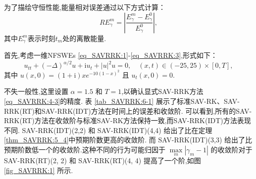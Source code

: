 为了描绘守恒性能,能量相对误差通过以下方式计算：
\begin{equation}\label{eq_SAVRRK:105}
	R E_{\gamma}^{m} = \left|\frac{E_{\gamma}^{m} - E_{\gamma}^{0}}{E_{\gamma}^{0}}\right|,
\end{equation}
其中$E_{\gamma}^{m}$表示时刻$t_m$处的离散能量.

\begin{example}\label{exp_SAVRRK:1}
	\cite{ranLinearlyImplicitConservative2016} 
	首先,考虑一维NFSWEs \eqref{eq_SAVRRK:1}-\eqref{eq_SAVRRK:3},形式如下：
	\begin{equation}\label{eq_SAVRRK:108}
		u_{t t}+(-\Delta)^{\alpha / 2} u+\mathrm{i}u_t+|u|^2 u=0, \quad (x,t)\in  (-25, 25)\times[0, T],
	\end{equation}
	其中 $u(x, 0)=(1+\mathrm{i}) x e^{-10(1-x)^2}$ 且 $u_t(x, 0)=0$.
	\end{example}
		
	
		
	不失一般性,这里设置 $\alpha=1.5$ 和 $T=1$,以确认显式SAV-RRK方法\eqref{eq_SAVRRK:4-3}的精度.
	表 \ref{tab_SAVRRK:6-1} 展示了标准SAV-RK、SAV-RRK(RT)和SAV-RRK(IDT)方法在时间上的误差和收敛阶.
	可以看到,所有的SAV-RRK(RT)方法在收敛阶与标准SAV-RK方法保持一致,而SAV-RRK(IDT)方法表现不同.
	SAV-RRK(IDT)(2,2) 和 SAV-RRK(IDT)(4,4) 给出了比在定理\ref{thm_SAVRRK:5_4}中预期阶数更高的收敛阶.
	而 SAV-RRK(IDT)(3,3) 给出了比预期阶数低一个的收敛阶.这种不同的行为可能归因于 $\max\limits _m\left|\gamma_m-1\right|$ 
	的收敛阶对于 SAV-RRK(RT)(2, 2) 和 SAV-RRK(RT)(4, 4) 提高了一个阶,如图 \ref{fig_SAVRRK:1} 所示.



